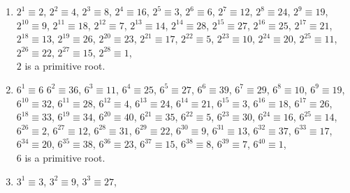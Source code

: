 {\begin{enumerate}
\begin{enumerate}[label=(\roman*)]
            \(5^{2} \equiv 2
            \), \(5^{3} \equiv 10
            \), \(5^{4} \equiv 4
            \), \(5^{5} \equiv 20
            \), \(5^{6} \equiv 8
            \), \(5^{7} \equiv 17
            \), \(5^{8} \equiv 16
            \), \(5^{9} \equiv 11
            \), \(5^{10} \equiv 9
            \), \(5^{11} \equiv 22
            \), \(5^{12} \equiv 18
            \), \(5^{13} \equiv 21
            \), \(5^{14} \equiv 13
            \), \(5^{15} \equiv 19
            \), \(5^{16} \equiv 3
            \), \(5^{17} \equiv 15
            \), \(5^{18} \equiv 6
            \), \(5^{19} \equiv 7
            \), \(5^{20} \equiv 12
            \), \(5^{21} \equiv 14\),
            \(5^{22} \equiv 1\), \\
            \(5\) is a primitive root.
        \item \(2^1 \equiv 2\),
\(2^{2} \equiv 4\),
\(2^{3} \equiv 8\),
\(2^{4} \equiv 16\),
\(2^{5} \equiv 3\),
\(2^{6} \equiv 6\),
\(2^{7} \equiv 12\),
\(2^{8} \equiv 24\),
\(2^{9} \equiv 19\),
\(2^{10} \equiv 9\),
\(2^{11} \equiv 18\),
\(2^{12} \equiv 7\),
\(2^{13} \equiv 14\),
\(2^{14} \equiv 28\),
\(2^{15} \equiv 27\),
\(2^{16} \equiv 25\),
\(2^{17} \equiv 21\),
\(2^{18} \equiv 13\),
\(2^{19} \equiv 26\),
\(2^{20} \equiv 23\),
\(2^{21} \equiv 17\),
\(2^{22} \equiv 5\),
\(2^{23} \equiv 10\),
\(2^{24} \equiv 20\),
\(2^{25} \equiv 11\),
\(2^{26} \equiv 22\),
\(2^{27} \equiv 15\),
\(2^{28} \equiv 1\), \\
\(2\) is a primitive root.
\item \(6^{1} \equiv 6\)
\(6^{2} \equiv 36\),
\(6^{3} \equiv 11\),
\(6^{4} \equiv 25\),
\(6^{5} \equiv 27\),
\(6^{6} \equiv 39\),
\(6^{7} \equiv 29\),
\(6^{8} \equiv 10\),
\(6^{9} \equiv 19\),
\(6^{10} \equiv 32\),
\(6^{11} \equiv 28\),
\(6^{12} \equiv 4\),
\(6^{13} \equiv 24\),
\(6^{14} \equiv 21\),
\(6^{15} \equiv 3\),
\(6^{16} \equiv 18\),
\(6^{17} \equiv 26\),
\(6^{18} \equiv 33\),
\(6^{19} \equiv 34\),
\(6^{20} \equiv 40\),
\(6^{21} \equiv 35\),
\(6^{22} \equiv 5\),
\(6^{23} \equiv 30\),
\(6^{24} \equiv 16\),
\(6^{25} \equiv 14\),
\(6^{26} \equiv 2\),
\(6^{27} \equiv 12\),
\(6^{28} \equiv 31\),
\(6^{29} \equiv 22\),
\(6^{30} \equiv 9\),
\(6^{31} \equiv 13\),
\(6^{32} \equiv 37\),
\(6^{33} \equiv 17\),
\(6^{34} \equiv 20\),
\(6^{35} \equiv 38\),
\(6^{36} \equiv 23\),
\(6^{37} \equiv 15\),
\(6^{38} \equiv 8\),
\(6^{39} \equiv 7\),
\(6^{40} \equiv 1\),\\
\(6\) is a primitive root.
\item \(3^{1} \equiv 3\),
\(3^{2} \equiv 9\),
\(3^{3} \equiv 27\),

\end{enumerate}
\end{enumerate}}
